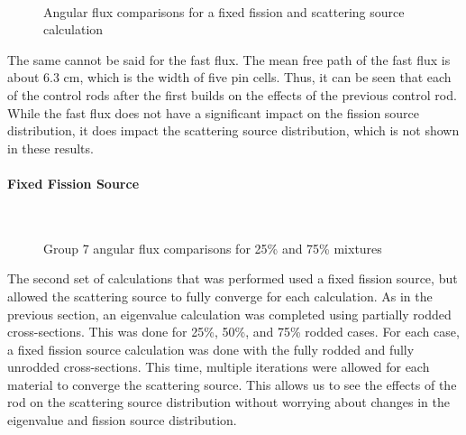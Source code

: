 \begin{figure}[H]
    \centering
    ~
    \caption{Angular flux comparisons for a fixed fission and scattering source calculation}\label{f:1dmoc-fixed-50-angflux}
\end{figure}

The same cannot be said for the fast flux.  The mean free path of the fast flux is about 6.3 cm, which is the width of five pin cells.  Thus, it can be seen that each of the control rods after the first builds on the effects of the previous control rod.  While the fast flux does not have a significant impact on the fission source distribution, it does impact the scattering source distribution, which is not shown in these results.

\paragraph{Fixed Fission Source}

\begin{figure}[H]
    \centering
    \hfill
    ~
    \caption{Group 7 angular flux comparisons for 25\% and 75\% mixtures}\label{f:1dmoc-angflux7}
\end{figure}

The second set of calculations that was performed used a fixed fission source, but allowed the scattering source to fully converge for each calculation.  As in the previous section, an eigenvalue calculation was completed using partially rodded cross-sections.  This was done for 25\%, 50\%, and 75\% rodded cases.  For each case, a fixed fission source calculation was done with the fully rodded and fully unrodded cross-sections.  This time, multiple iterations were allowed for each material to converge the scattering source.  This allows us to see the effects of the rod on the scattering source distribution without worrying about changes in the eigenvalue and fission source distribution.

